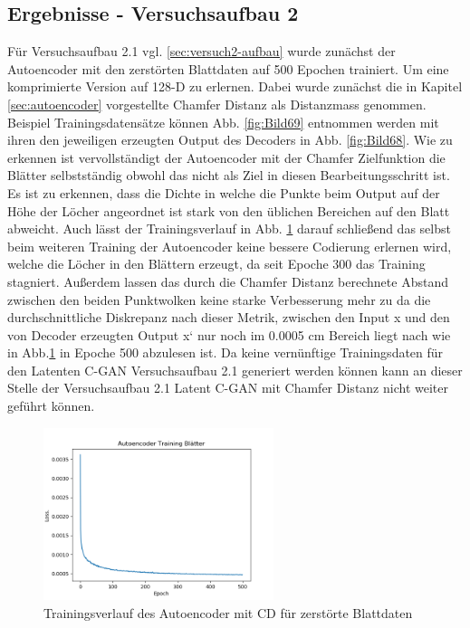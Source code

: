\documentclass{llncs}
\begin{document}
\subsection{Ergebnisse - Versuchsaufbau 2}

Für Versuchsaufbau 2.1 vgl. \ref{sec:versuch2-aufbau} wurde zunächst der Autoencoder mit den zerstörten Blattdaten auf 500 Epochen trainiert. Um eine komprimierte Version auf 128-D zu erlernen. Dabei wurde zunächst die in Kapitel \ref{sec:autoencoder} vorgestellte Chamfer Distanz als Distanzmass genommen. Beispiel Trainingsdatensätze können  Abb. \ref{fig:Bild69} entnommen werden mit ihren den jeweiligen erzeugten Output des Decoders in Abb. \ref{fig:Bild68}. Wie zu erkennen ist vervollständigt der Autoencoder mit der Chamfer Zielfunktion die Blätter selbstständig obwohl das nicht als Ziel in diesen Bearbeitungsschritt ist. Es ist zu erkennen, dass die Dichte in welche die Punkte beim Output auf der Höhe der Löcher angeordnet ist stark von den üblichen Bereichen auf den Blatt abweicht. Auch lässt der Trainingsverlauf in Abb. \ref{fig:Bild67} darauf schließend das selbst beim weiteren Training der Autoencoder keine bessere Codierung erlernen wird, welche die Löcher in den Blättern erzeugt, da seit Epoche 300 das Training stagniert. Außerdem lassen das durch die Chamfer Distanz berechnete Abstand zwischen den beiden Punktwolken keine starke Verbesserung mehr zu da die durchschnittliche Diskrepanz nach dieser Metrik, zwischen den Input x und den von Decoder erzeugten Output x` nur noch im 0.0005 cm Bereich liegt nach wie in Abb.\ref{fig:Bild67} in Epoche 500 abzulesen ist. Da keine vernünftige Trainingsdaten für den Latenten C-GAN Versuchsaufbau 2.1 generiert werden können kann an dieser Stelle der Versuchsaufbau 2.1 Latent C-GAN  mit Chamfer Distanz nicht weiter geführt können. 

\begin{figure}[htbp] 
	\centering
	\includegraphics[width=0.6\textwidth]{autoencoder_training_blaetter_result.png}
	\caption{Trainingsverlauf des Autoencoder mit CD für zerstörte Blattdaten}
	\label{fig:Bild67}
\end{figure}
\end{document}
